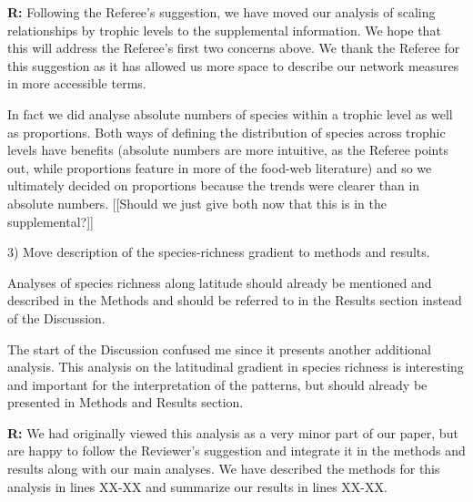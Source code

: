 \documentclass[12pt]{letter}
\newenvironment{refquote}{\bigskip \begin{it}}{\end{it}\smallskip}
\begin{document}
  \textbf{R:} Following the Referee's suggestion, we have moved our analysis
  of scaling relationships by trophic levels to the supplemental information.
  We hope that this will address the Referee's first two concerns above. We thank the
  Referee for this suggestion as it has allowed us more space to describe our network
  measures in more accessible terms.


  In fact we did analyse absolute numbers of species within a trophic level as well 
  as proportions. Both ways of defining the distribution of species across trophic levels
  have benefits (absolute numbers are more intuitive, as the Referee points out, while
  proportions feature in more of the food-web literature) and so we ultimately decided
  on proportions because the trends were clearer than in absolute numbers. [[Should we just
  give both now that this is in the supplemental?]]


  3) Move description of the species-richness gradient to methods and results.


  \begin{refquote}

     Analyses of species richness along latitude should already be mentioned
     and described in the Methods and should be referred to in the Results
     section instead of the Discussion.

     \smallskip

      The start of the Discussion confused me since it presents another
      additional analysis. This analysis on the latitudinal gradient in
      species richness is interesting and important for the interpretation of
      the patterns, but should already be presented in Methods and Results
      section.

  \end{refquote}


  \textbf{R:} We had originally viewed this analysis as a very minor part of our paper,
  but are happy to follow the Reviewer's suggestion and integrate it in the methods and
  results along with our main analyses. We have described the methods for this analysis
  in lines XX-XX and summarize our results in lines XX-XX.
\end{document}
